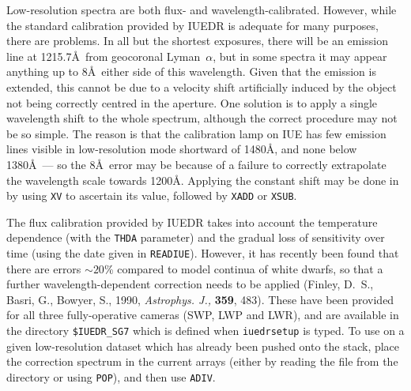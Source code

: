 Low-resolution spectra are both flux- and wavelength-calibrated.  However, while
the standard calibration provided by IUEDR is adequate for many purposes, there
are problems.  In all but the shortest exposures, there will be an emission
line at 1215.7\AA\ from geocoronal Lyman~$\alpha$, but in some spectra it may
appear anything up to 8\AA\ either side of this wavelength. Given that the
emission is extended, this cannot be due to a velocity shift artificially
induced by the object not being correctly centred in the aperture.  One
solution is to apply a single wavelength shift to the whole spectrum, although
the correct procedure may not be so simple.  The reason is that the calibration
lamp on IUE has few emission lines visible in low-resolution mode shortward of
1480\AA , and none below 1380\AA\ --- so the 8\AA\ error may be because of a
failure to correctly extrapolate the wavelength scale towards 1200\AA\@.
Applying the constant shift may be done in
 by using \verb+XV+ to
ascertain its value, followed by \verb+XADD+ or \verb+XSUB+\@.

\begin{latexonly}
The flux calibration provided by IUEDR takes into account the temperature
dependence (with the \verb+THDA+ parameter) and the gradual loss of sensitivity
over time (using the date given in \verb+READIUE+)\@.  However, it has recently
been found that there are errors $\sim 20$\% compared to model continua of
white dwarfs, so that a further wavelength-dependent correction needs to be
applied (Finley, D.~S., Basri, G., Bowyer, S., 1990, {\it Astrophys. J.,} {\bf
359}, 483). These have been provided for all three fully-operative cameras
(SWP, LWP and LWR), and are available in the directory
\verb+$IUEDR_SG7+ which is defined when \verb+iuedrsetup+ is typed.
To use on a given low-resolution dataset which has already been pushed onto the
stack, place the correction spectrum in the current arrays (either by reading
the file from the directory or using \verb+POP+), and then use
\verb+ADIV+\@.
\end{latexonly}


